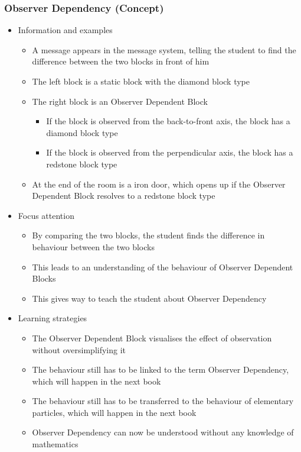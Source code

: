 \documentclass[11pt,twoside]{report} %
\begin{document}
\subsubsection{Observer Dependency (Concept)}
\begin{itemize}
	\item Information and examples
	\begin{itemize}
		\item A message appears in the message system, telling the student to find the difference between the two blocks in front of him
		\item The left block is a static block with the diamond block type
		\item The right block is an Observer Dependent Block
		\begin{itemize}
			\item If the block is observed from the back-to-front axis, the block has a diamond block type
			\item If the block is observed from the perpendicular axis, the block has a redstone block type
		\end{itemize}
		\item At the end of the room is a iron door, which opens up if the Observer Dependent Block resolves to a redstone block type
	\end{itemize}
	\item Focus attention
	\begin{itemize}
		\item By comparing the two blocks, the student finds the difference in behaviour between the two blocks
		\item This leads to an understanding of the behaviour of Observer Dependent Blocks
		\item This gives way to teach the student about Observer Dependency
	\end{itemize}
	\item Learning strategies
	\begin{itemize}
		\item The Observer Dependent Block visualises the effect of observation without oversimplifying it
		\item The behaviour still has to be linked to the term Observer Dependency, which will happen in the next book
		\item The behaviour still has to be transferred to the behaviour of elementary particles, which will happen in the next book
		\item Observer Dependency can now be understood without any knowledge of mathematics

\end{itemize}
\end{itemize}
\end{document}
